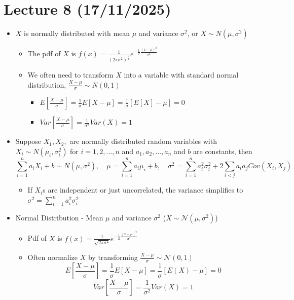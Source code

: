 \documentclass{article}
\begin{document}
\section{Lecture 8 (17/11/2025)}
\begin{itemize}
    \item $X$ is normally distributed with mean $\mu$ and variance $\sigma^2$, or $X \sim N(\mu,\sigma^2)$
    \begin{itemize}
        \item The pdf of $X$ is $f(x)=\frac{1}{(2\pi \sigma^2)^{\frac{1}{2}}}e^{-\frac{1}{2}\frac{(x-\mu)^2}{\sigma^2}}$
        \item We often need to transform $X$ into a variable with standard normal distribution, $\frac{X-\mu}{\sigma} \sim N(0,1)$
        \begin{itemize}
            \item $E\left[ \frac{X-\mu}{\sigma} \right] = \frac{1}{\sigma} E[X-\mu] = \frac{1}{\sigma} [E[X] - \mu] = 0$
            \item $Var\left[ \frac{X-\mu}{\sigma} \right] = \frac{1}{\sigma^2}Var(X) = 1$
        \end{itemize}
    \end{itemize}
    \item Suppose $X_1,X_2,$ are normally distributed random variables with $X_i \sim N(\mu_i,\sigma_i^2)$ for $i=1,2,\dots,n$ and $a_1,a_2,\dots,a_n$ and $b$ are constants, then
    \[
    \sum_{i=1}^n a_iX_i + b \sim N(\mu,\sigma^2), \quad \mu = \sum_{i=1}^n a_i \mu_i + b, \quad \sigma^2 = \sum_{i=1}^n a_i^2 \sigma_i^2 + 2\sum_{i<j} a_ia_j Cov(X_i,X_j)
    \]
    \begin{itemize}
        \item If $X_i$s are independent or just uncorrelated, the variance simplifies to $\sigma^2 = \sum_{i=1}^n a_i^2 \sigma_i^2$
    \end{itemize}
    \item Normal Distribution - Mean $\mu$ and variance $\sigma^2$ ($X \sim \mathcal{N} (\mu, \sigma^2)$)
    \begin{itemize}
        \item Pdf of $X$ is $f(x)=\frac{1}{\sqrt{2 \pi \sigma^2}} e^{-\frac{1}{2} \frac{(x-\mu)^2}{\sigma^2}}$
        \item Often normalize $X$ by transforming $\frac{X - \mu}{\sigma} \sim \mathcal{N}(0,1)$
        \[
        E \left[ \frac{X - \mu}{\sigma} \right] = \frac{1}{\sigma} E[X - \mu] = \frac{1}{\sigma} [E(X) - \mu] = 0
        \]
        \[
        Var \left[ \frac{X-\mu}{\sigma} \right] = \frac{1}{\sigma^2} Var(X) = 1
\]
\end{itemize}
\end{itemize}
\end{document}
